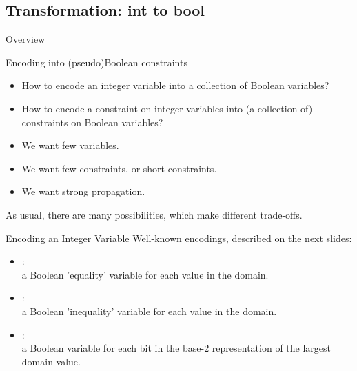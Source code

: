 \documentclass{cons-beamer}
\begin{document}
\subsection*{Transformation: int to bool}
\begin{frame}{Overview}
\end{frame}


\begin{frame}{Encoding into (pseudo)Boolean constraints}
  \begin{itemize}
    \item How to encode an integer variable into a collection of Boolean
      variables?
    \item How to encode a constraint on integer variables into (a
      collection of) constraints on Boolean variables?
  \end{itemize}
  \vfill

  \begin{itemize}
    \item We want few variables.
    \item We want few constraints, or short constraints.
    \item We want strong propagation.
  \end{itemize}
  \vfill%

  As usual, there are many possibilities, which make different trade-offs.
\end{frame}

\begin{frame}{Encoding an Integer Variable}
  Well-known encodings, described on the next slides: \vfill
  \begin{itemize}
    \item {}: \\
      a Boolean 'equality' variable for each value in the domain. \vfill
    \item {}: \\
      a Boolean 'inequality' variable for each value in the domain. \vfill
    \item {}: \\
      a Boolean variable for each bit in the base-2 representation of
      the largest domain value.
  \end{itemize}
\end{frame}
\end{document}
